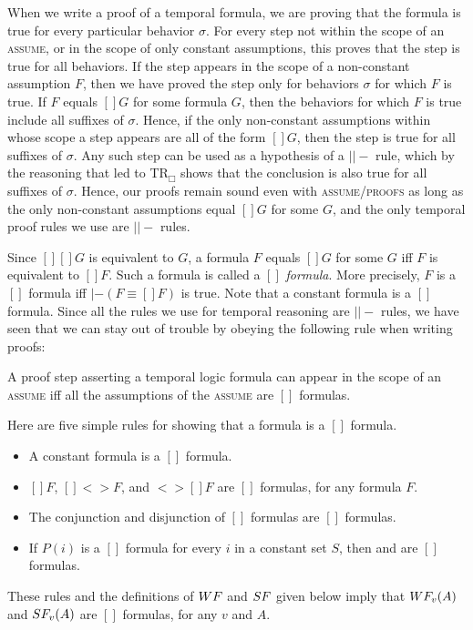 \documentclass[fleqn,leqno]{article}
\begin{document}
When we write a proof of a temporal formula, we are proving that the
formula is true for every particular behavior $\sigma$.  For every
step not within the scope of an \textsc{assume}, or in the scope of
only constant assumptions, this proves that the step is true for all
behaviors.  If the step appears in the scope of a non-constant
assumption $F$, then we have proved the step only for behaviors
$\sigma$ for which $F$ is true.  If $F$ equals $[]G$ for some formula
$G$, then the behaviors for which $F$ is true include all suffixes of
$\sigma$.  Hence, if the only non-constant assumptions within whose
scope a step appears are all of the form $[]G$, then the step is true
for all suffixes of $\sigma$.  Any such step can be used as a
hypothesis of a $||-$ rule, which by the reasoning that led to
TR$_{\Box}$ shows that the conclusion is also true for all suffixes of
$\sigma$.  Hence, our proofs remain sound even with
\textsc{assume}/\textsc{proofs} as long as the only non-constant
assumptions equal $[]G$ for some $G$, and the only temporal proof rules
we use are $||-$ rules.

Since $[][]G$ is equivalent to $G$, a formula $F$ equals $[]G$
for some $G$ iff $F$ is equivalent to $[]F$.
Such a formula is called a $[]$
\emph{formula}.  More precisely, $F$ is a $[]$ formula iff
$|-(F\equiv[]F)$ is true.  Note that a constant formula is a $[]$
formula.  Since all the rules we use for temporal reasoning are $||-$
rules, we have seen that we can stay out of trouble by obeying the
following rule when writing proofs:
\begin{display}
A proof step asserting a temporal logic formula can appear in
the scope of an \textsc{assume} iff all the assumptions 
of the \textsc{assume} are $[]$
formulas.
\end{display}
Here are five simple rules for showing that a formula is a $[]$
formula.
\begin{itemize}
\item A constant formula is a $[]$ formula.

\item $[]F$, $[]<>F$, and $<>[]F$ are $[]$ formulas, for any formula $F$.

\item The conjunction and disjunction of $[]$ formulas are $[]$ formulas.

\item If $P(i)$ is a $[]$ formula for every $i$ in a constant set $S$,
then 
and 
are $[]$ formulas.
\end{itemize}
These rules and the definitions of $\WF$ and $\SF$ given below imply
that $\WF_{v}(A)$ and $\SF_{v}(A)$ are $[]$ formulas, for any $v$ and
$A$.
\end{document}

